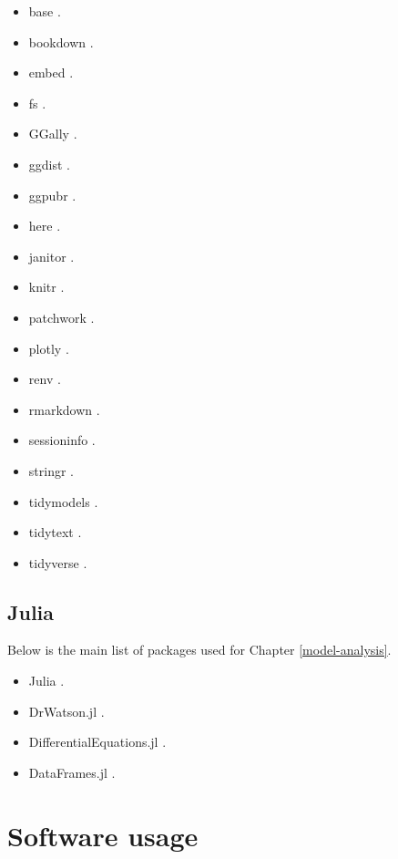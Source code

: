 \documentclass[
  12pt,
  a4paper,
  oneside]{krantz}
\providecommand{\tightlist}{%
  \setlength{\itemsep}{0pt}\setlength{\parskip}{0pt}}
\begin{document}
\begin{itemize}
\tightlist
\item
  base \citep{R-base}.
\item
  bookdown \citep{R-bookdown}.
\item
  embed \citep{R-embed}.
\item
  fs \citep{R-fs}.
\item
  GGally \citep{R-GGally}.
\item
  ggdist \citep{R-ggdist}.
\item
  ggpubr \citep{R-ggpubr}.
\item
  here \citep{R-here}.
\item
  janitor \citep{R-janitor}.
\item
  knitr \citep{R-knitr}.
\item
  patchwork \citep{R-patchwork}.
\item
  plotly \citep{R-plotly}.
\item
  renv \citep{R-renv}.
\item
  rmarkdown \citep{R-rmarkdown}.
\item
  sessioninfo \citep{R-sessioninfo}.
\item
  stringr \citep{R-stringr}.
\item
  tidymodels \citep{R-tidymodels}.
\item
  tidytext \citep{R-tidytext}.
\item
  tidyverse \citep{R-tidyverse}.
\end{itemize}

\hypertarget{julia}{%
\section{Julia}\label{julia}}

Below is the main list of packages used for Chapter
\ref{model-analysis}.

\begin{itemize}
\tightlist
\item
  Julia \citep{Julia-2017}.
\item
  DrWatson.jl \citep{datseris2020}.
\item
  DifferentialEquations.jl \citep{rackauckas2017differentialequations, rackauckas2017adaptive, rackauckas_stability-optimized_2018}.
\item
  DataFrames.jl \citep{white2021}.
\end{itemize}

\hypertarget{software-usage}{%
\chapter{Software usage}\label{software-usage}}
\end{document}
